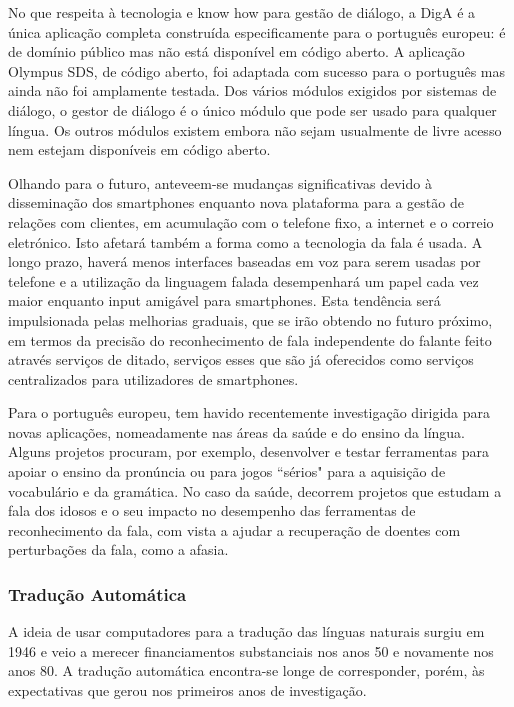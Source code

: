 \begin{multicols}{2}
No que respeita à tecnologia e know how para gestão de diá\-lo\-go, a DigA é a única aplicação completa
construída especificamente para o português europeu: é de domínio público mas não está disponível em código aberto. 
A aplicação Olympus SDS, de código aberto, foi adaptada com sucesso para o português mas ainda não foi amplamente testada. 
Dos vários módulos exigidos por sistemas de diálogo, o gestor de diálogo é o único módulo que pode ser usado para qualquer língua. 
Os outros módulos existem embora não sejam usualmente de livre acesso nem estejam disponíveis em código aberto. 

Olhando para o futuro, anteveem-se mudanças significativas devido à disseminação dos smartphones enquanto nova plataforma 
para a gestão de relações com clientes, em acumulação com o telefone fixo, a internet e o correio eletrónico. 
Isto afetará também a forma como a tecnologia da fala é usada. 
A longo prazo, haverá menos interfaces baseadas em voz para serem usadas por telefone 
e a utilização da linguagem falada desempenhará um papel cada vez maior enquanto input amigável para smartphones. 
Esta tendência será impulsionada pelas melhorias graduais, que se irão obtendo no futuro próximo, em termos da precisão do reconhecimento de fala independente do falante 
feito através serviços de ditado, serviços esses que são já oferecidos como serviços centralizados para utilizadores de smartphones. 

Para o português europeu, tem havido recentemente investigação dirigida para novas aplicações, nomeadamente nas áreas da saúde e do ensino da língua. 
Alguns projetos procuram, por exemplo, desenvolver e testar ferramentas para apoiar o ensino da pronúncia ou para jogos “sérios" 
para a aquisição de vocabulário e da gramática. No caso da saúde, decorrem projetos que estudam a fala dos idosos
e o seu impacto no desempenho das ferramentas de reconhecimento da fala, com vista a ajudar a recuperação 
de doentes com perturbações da fala, como a afasia.



\subsubsection{Tradução Automática}

A ideia de usar computadores para a tradução das línguas naturais surgiu em 1946 e veio a merecer financiamentos substanciais nos anos 50 e novamente nos anos 80. 
A tradução automática encontra-se longe de corresponder, porém, às expectativas que gerou nos primeiros anos de investigação.


\end{multicols}

